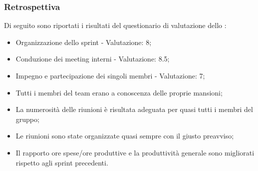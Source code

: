 \subsubsection{Retrospettiva}

\par Di seguito sono riportati i risultati del questionario di valutazione dello :
\begin{itemize}
  \item Organizzazione dello sprint - Valutazione: 8;
  \item Conduzione dei meeting interni - Valutazione: 8.5;
  \item Impegno e partecipazione dei singoli membri - Valutazione: 7;
  \item Tutti i membri del team erano a conoscenza delle proprie mansioni;
  \item La numerosità delle riunioni è risultata adeguata per quasi tutti i membri del gruppo;
  \item Le riunioni sono state organizzate quasi sempre con il giusto preavviso;
  \item Il rapporto ore spese/ore produttive e la produttività generale sono migliorati rispetto agli sprint precedenti.
\end{itemize}

